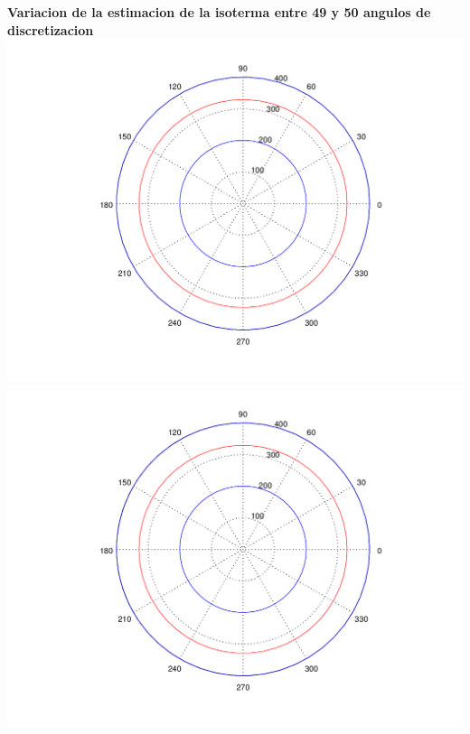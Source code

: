 \begin{enumerate}
	  	\textbf{Variacion de la estimacion de la isoterma entre 49 y 50 angulos de discretizacion}\\
		\includegraphics[scale=0.35]{experimentos1a_1b/evolucion_posicion_isoterma_temperatura/variacion_angulos_radio_fijo_se_suaviza_isoterma/test10_050_radios_049_angulos_inst_001_isomap.png}
		\includegraphics[scale=0.35]{experimentos1a_1b/evolucion_posicion_isoterma_temperatura/variacion_angulos_radio_fijo_se_suaviza_isoterma/test10_050_radios_050_angulos_inst_001_isomap.png}


\end{enumerate}
